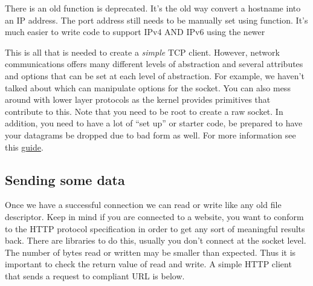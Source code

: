 There is an old function  is deprecated.
It's the old way convert a hostname into an IP address.
The port address still needs to be manually set using  function.
It's much easier to write code to support IPv4 AND IPv6 using the newer 

This is all that is needed to create a \textit{simple} TCP client. However, network communications offers many different levels of abstraction and several attributes and options that can be set at each level of abstraction.
For example, we haven't talked about  which can manipulate options for the socket.
You can also mess around with lower layer protocols as the kernel provides primitives that contribute to this.
Note that you need to be root to create a raw socket.
In addition, you need to have a lot of ``set up'' or starter code, be prepared to have your datagrams be dropped due to bad form as well.
For more information see this \href{http://www.beej.us/guide/bgnet/output/html/multipage/getaddrinfoman.html}{guide}.

\subsection{Sending some data}

Once we have a successful connection we can read or write like any old file descriptor.
Keep in mind if you are connected to a website, you want to conform to the HTTP protocol specification in order to get any sort of meaningful results back.
There are libraries to do this, usually you don't connect at the socket level.
The number of bytes read or written may be smaller than expected.
Thus it is important to check the return value of read and write.
A simple HTTP client that sends a request to compliant URL is below.


